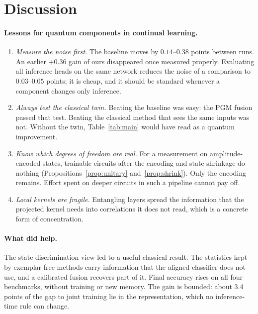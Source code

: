 \section{Discussion}
\label{sec:conclusion}

\paragraph{Lessons for quantum components in continual learning.}
\begin{enumerate}
  \item \emph{Measure the noise first.} The baseline moves by $0.14$--$0.38$
    points between runs. An earlier $+0.36$ gain of ours disappeared once
    measured properly. Evaluating all inference heads on the same network
    reduces the noise of a comparison to $0.03$--$0.05$ points; it is cheap,
    and it should be standard whenever a component changes only inference.
  \item \emph{Always test the classical twin.} Beating the baseline was easy:
    the PGM fusion passed that test. Beating the classical method that sees
    the same inputs was not. Without the twin, Table~\ref{tab:main} would
    have read as a quantum improvement.
  \item \emph{Know which degrees of freedom are real.} For a measurement on
    amplitude-encoded states, trainable circuits after the encoding and
    state shrinkage do nothing (Propositions~\ref{prop:unitary}
    and~\ref{prop:shrink}). Only the encoding remains. Effort spent on
    deeper circuits in such a pipeline cannot pay off.
  \item \emph{Local kernels are fragile.} Entangling layers spread the
    information that the projected kernel needs into correlations it does
    not read, which is a concrete form of concentration.
\end{enumerate}

\paragraph{What did help.}
The state-discrimination view led to a useful classical result. The
statistics kept by exemplar-free methods carry information that the aligned
classifier does not use, and a calibrated fusion recovers part of it.
Final accuracy rises on all four benchmarks, without training or new memory.
The gain is bounded: about $3.4$ points of the gap to joint training lie in
the representation, which no inference-time rule can change.

